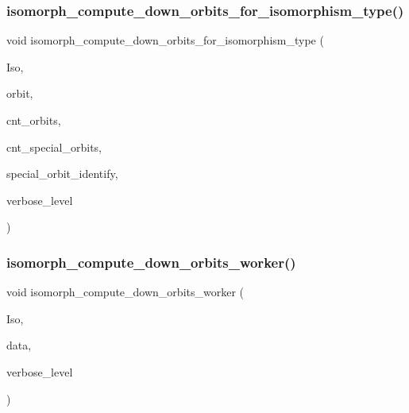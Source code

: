 \subsubsection{\texorpdfstring{isomorph\+\_\+compute\+\_\+down\+\_\+orbits\+\_\+for\+\_\+isomorphism\+\_\+type()}{isomorph\_compute\_down\_orbits\_for\_isomorphism\_type()}}
{\footnotesize\ttfamily void isomorph\+\_\+compute\+\_\+down\+\_\+orbits\+\_\+for\+\_\+isomorphism\+\_\+type (\begin{DoxyParamCaption}\item[{\mbox{\hyperlink{classisomorph}{isomorph}} $\ast$}]{Iso,  }\item[{\mbox{\hyperlink{galois_8h_a09fddde158a3a20bd2dcadb609de11dc}{I\+NT}}}]{orbit,  }\item[{\mbox{\hyperlink{galois_8h_a09fddde158a3a20bd2dcadb609de11dc}{I\+NT}} \&}]{cnt\+\_\+orbits,  }\item[{\mbox{\hyperlink{galois_8h_a09fddde158a3a20bd2dcadb609de11dc}{I\+NT}} \&}]{cnt\+\_\+special\+\_\+orbits,  }\item[{\mbox{\hyperlink{galois_8h_a09fddde158a3a20bd2dcadb609de11dc}{I\+NT}} $\ast$\&}]{special\+\_\+orbit\+\_\+identify,  }\item[{\mbox{\hyperlink{galois_8h_a09fddde158a3a20bd2dcadb609de11dc}{I\+NT}}}]{verbose\+\_\+level }\end{DoxyParamCaption})}

\mbox{\label{isomorph__global_8_c_a4edf4a833ce5638a3d58cfae1c702b37}} 
\subsubsection{\texorpdfstring{isomorph\+\_\+compute\+\_\+down\+\_\+orbits\+\_\+worker()}{isomorph\_compute\_down\_orbits\_worker()}}
{\footnotesize\ttfamily void isomorph\+\_\+compute\+\_\+down\+\_\+orbits\+\_\+worker (\begin{DoxyParamCaption}\item[{\mbox{\hyperlink{classisomorph}{isomorph}} $\ast$}]{Iso,  }\item[{void $\ast$}]{data,  }\item[{\mbox{\hyperlink{galois_8h_a09fddde158a3a20bd2dcadb609de11dc}{I\+NT}}}]{verbose\+\_\+level }\end{DoxyParamCaption})}

